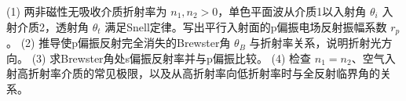 (1) 两非磁性无吸收介质折射率为 \(n_1,n_2>0\)，单色平面波从介质1以入射角 \(\theta_i\) 入射介质2，透射角 \(\theta_t\) 满足Snell定律。写出平行入射面的p偏振电场反射振幅系数 \(r_p\)。
(2) 推导使p偏振反射完全消失的Brewster角 \(\theta_B\) 与折射率关系，说明折射光方向。
(3) 求Brewster角处s偏振反射率并与p偏振比较。
(4) 检查 \(n_1=n_2\)、空气入射高折射率介质的常见极限，以及从高折射率向低折射率时与全反射临界角的关系。
